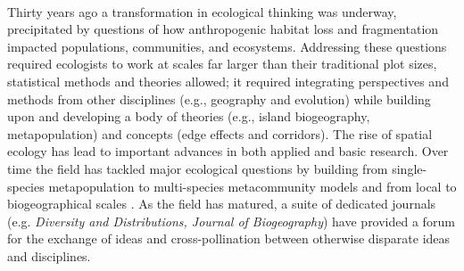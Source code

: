 \documentclass[11pt,a4paper,oneside]{article}
\begin{document}
\tableofcontents

\newpage
\linenumbers

\\

Thirty years ago a transformation in ecological thinking was underway, precipitated by questions of how anthropogenic habitat loss and fragmentation impacted populations, communities, and ecosystems. Addressing these questions required ecologists to work at 
scales far larger than their traditional plot sizes, statistical methods and theories allowed; it required integrating perspectives and methods from other disciplines (e.g., geography and evolution) while building upon and developing a body of theories (e.g., island biogeography, metapopulation) and concepts (edge effects and corridors). The rise of spatial ecology has lead to important advances in both applied and basic research. Over time the field has tackled major ecological questions by building from single-species metapopulation to multi-species metacommunity models \citep{Pillai2011} and from local to biogeographical scales \citep{bell2001}. As the field has matured, a suite of dedicated journals  (e.g. \emph{Diversity and Distributions, Journal of Biogeography}) have provided a forum for the exchange of ideas and cross-pollination between otherwise disparate ideas and disciplines. %
\end{document}
